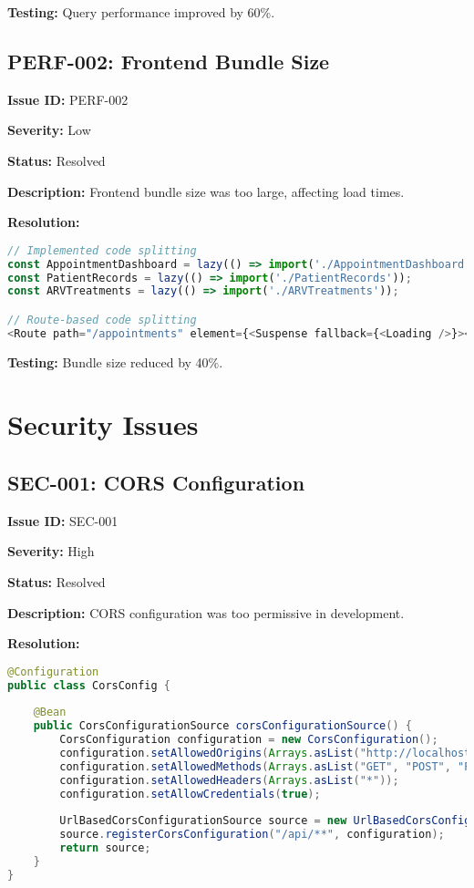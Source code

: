 \documentclass[12pt,a4paper]{article}
\begin{document}
\textbf{Testing:} Query performance improved by 60\%.

\subsection{PERF-002: Frontend Bundle Size}

\textbf{Issue ID:} PERF-002

\textbf{Severity:} Low

\textbf{Status:} Resolved

\textbf{Description:} Frontend bundle size was too large, affecting load times.

\textbf{Resolution:}
\begin{lstlisting}[language=JavaScript, caption=Code Splitting]
// Implemented code splitting
const AppointmentDashboard = lazy(() => import('./AppointmentDashboard'));
const PatientRecords = lazy(() => import('./PatientRecords'));
const ARVTreatments = lazy(() => import('./ARVTreatments'));

// Route-based code splitting
<Route path="/appointments" element={<Suspense fallback={<Loading />}><AppointmentDashboard /></Suspense>} />
\end{lstlisting}

\textbf{Testing:} Bundle size reduced by 40\%.

\section{Security Issues}

\subsection{SEC-001: CORS Configuration}

\textbf{Issue ID:} SEC-001

\textbf{Severity:} High

\textbf{Status:} Resolved

\textbf{Description:} CORS configuration was too permissive in development.

\textbf{Resolution:}
\begin{lstlisting}[language=Java, caption=CORS Configuration Fix]
@Configuration
public class CorsConfig {
    
    @Bean
    public CorsConfigurationSource corsConfigurationSource() {
        CorsConfiguration configuration = new CorsConfiguration();
        configuration.setAllowedOrigins(Arrays.asList("http://localhost:3000"));
        configuration.setAllowedMethods(Arrays.asList("GET", "POST", "PUT", "DELETE"));
        configuration.setAllowedHeaders(Arrays.asList("*"));
        configuration.setAllowCredentials(true);
        
        UrlBasedCorsConfigurationSource source = new UrlBasedCorsConfigurationSource();
        source.registerCorsConfiguration("/api/**", configuration);
        return source;
    }
}
\end{lstlisting}
\end{document}
